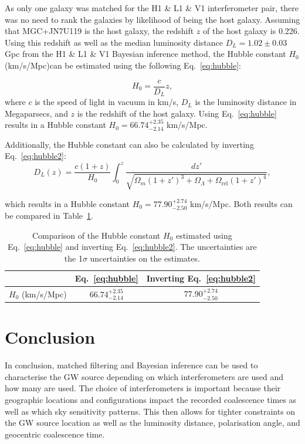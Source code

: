\documentclass[11pt,a4paper]{article}
\begin{document}
As only one galaxy was matched for the H1 \& L1 \& V1 interferometer pair, there was no need to rank the galaxies by likelihood of being the host galaxy. Assuming that MGC+JN7U119 is the host galaxy, the redshift $z$ of the host galaxy is 0.226. Using this redshift as well as the median luminosity distance $D_L = 1.02 \pm 0.03$ Gpc from the H1 \& L1 \& V1 Bayesian inference method, the Hubble constant $H_0$ (km/s/Mpc)can be estimated using the following Eq.~\ref{eq:hubble}:

\begin{equation}
    H_0 = \frac{c}{D_L}{z},
    \label{eq:hubble}
\end{equation}
where $c$ is the speed of light in vacuum in km/s, $D_L$ is the luminosity distance in Megaparsecs, and $z$ is the redshift of the host galaxy. Using Eq.~\ref{eq:hubble} results in a Hubble constant $H_0=66.74^{+2.35}_{-2.14}$ km/s/Mpc.

Additionally, the Hubble constant can also be calculated by inverting Eq.~\ref{eq:hubble2}:
\begin{equation}
    D_L(z) = \frac{c(1 + z)}{H_0} \int_0^z \frac{dz'}{\sqrt{\Omega_m (1 + z')^3 + \Omega_\Lambda + \Omega_\mathrm{rel}(1+z')^4}},
    \label{eq:hubble2}
\end{equation}

which results in a Hubble constant $H_0=77.90^{+2.74}_{-2.50}$ km/s/Mpc. Both results can be compared in Table~\ref{tab:hubble}.

\begin{table}[h]
    \centering
    \begin{tabular}{c|c|c}
    & Eq.~\ref{eq:hubble} & Inverting Eq.~\ref{eq:hubble2} \\
    \hline
    $H_0$ (km/s/Mpc) & $66.74^{+2.35}_{-2.14}$ & $77.90^{+2.74}_{-2.50}$ \\
    \end{tabular}
    \caption{Comparison of the Hubble constant $H_0$ estimated using Eq.~\ref{eq:hubble} and inverting Eq.~\ref{eq:hubble2}. The uncertainties are the 1$\sigma$ uncertainties on the estimates.}
    \label{tab:hubble}
\end{table}

\clearpage
\section{Conclusion}
\label{sec:conclusion}
In conclusion, matched filtering and Bayesian inference can be used to characterise the GW source depending on which interferometers are used and how many are used. The choice of interferometers is important because their geographic locations and configurations impact the recorded coalescence times as well as which sky sensitivity patterns. This then allows for tighter constraints on the GW source location as well as the luminosity distance, polarisation angle, and geocentric coalescence time. 
\end{document}
